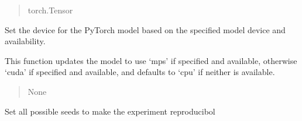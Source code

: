 \documentclass[letterpaper,10pt,english]{sphinxmanual}
\begin{document}
\begin{fulllineitems}
\begin{fulllineitems}
\begin{quote}
\begin{description}
\sphinxAtStartPar
torch.Tensor

\end{description}\end{quote}

\end{fulllineitems}


\begin{fulllineitems}
\label{\detokenize{modules:Resnet.ResNet.set_device}}
\pysigstartsignatures
{}
\pysigstopsignatures
\sphinxAtStartPar
Set the device for the PyTorch model based on the specified model device and availability.

\sphinxAtStartPar
This function updates the model to use ‘mps’ if specified and available, otherwise ‘cuda’
if specified and available, and defaults to ‘cpu’ if neither is available.
\begin{quote}\begin{description}
\sphinxAtStartPar
{}

\sphinxAtStartPar
None

\end{description}\end{quote}

\end{fulllineitems}


\begin{fulllineitems}
\label{\detokenize{modules:Resnet.ResNet.set_seed}}
\pysigstartsignatures
{}
\pysigstopsignatures
\sphinxAtStartPar
Set all possible seeds to make the experiment reproducibol

\end{fulllineitems}


\end{fulllineitems}

\label{\detokenize{modules:module-Alpha_Chomp_Env}}
\end{document}

